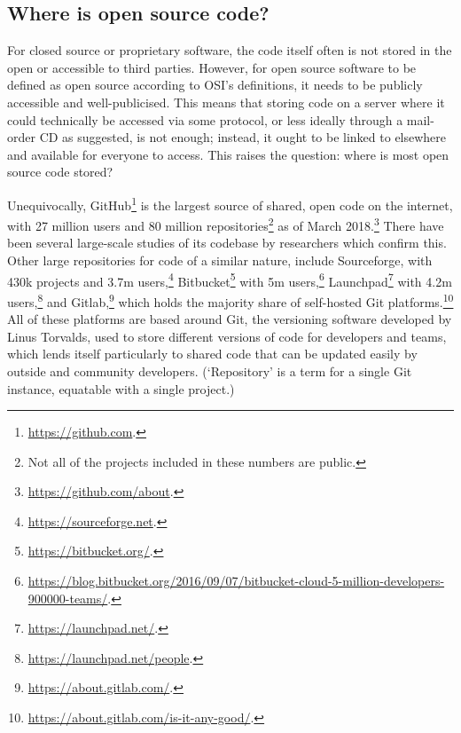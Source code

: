 \subsection{Where is open source code?}
\label{subsec:where-is-open-source-code}

For closed source or proprietary software, the code itself often is not stored in the open or accessible to third parties. However, for open source software to be defined as open source according to OSI's definitions, it needs to be publicly accessible and well-publicised. This means that storing code on a server where it could technically be accessed via some protocol, or less ideally through a mail-order CD as \citet{krauwer2006strengthening} suggested, is not enough; instead, it ought to be linked to elsewhere and available for everyone to access. This raises the question: where is most open source code stored?

Unequivocally, GitHub\footnote{\href{https://github.com}{https://github.com}. } is the largest source of shared, open code on the internet, with 27 million users and 80 million repositories\footnote{Not all of the projects  included in these numbers are public.} as of March 2018.\footnote{\href{https://github.com/about}{https://github.com/about}. } There have been several large-scale studies of its codebase by researchers \citep{gousios2012ghtorrent, allamanis2013mining, gousios2014lean, kalliamvakou2014promises, beller2016analyzing} which confirm this. Other large repositories for code of a similar nature, include Sourceforge, with 430k projects and 3.7m users,\footnote{\href{https://sourceforge.net/}{https://sourceforge.net}. } Bitbucket\footnote{\href{https://bitbucket.org/}{https://bitbucket.org/}. } with 5m users,\footnote{\href{https://blog.bitbucket.org/2016/09/07/bitbucket-cloud-5-million-developers-900000-teams/}{https://blog.bitbucket.org/2016/09/07/bitbucket-cloud-5-million-developers-900000-teams/}. } Launchpad\footnote{\href{https://launchpad.net/}{https://launchpad.net/}. } with 4.2m users,\footnote{\href{https://launchpad.net/people}{https://launchpad.net/people}. } and Gitlab,\footnote{\href{https://about.gitlab.com/}{https://about.gitlab.com/}. } which holds the majority share of self-hosted Git platforms.\footnote{\href{https://about.gitlab.com/is-it-any-good/}{https://about.gitlab.com/is-it-any-good/}. } All of these platforms are based around Git, the versioning software developed by Linus Torvalds, used to store different versions of code for developers and teams, which lends itself particularly to shared code that can be updated easily by outside and community developers. (`Repository' is a term for a single Git instance, equatable with a single project.)


